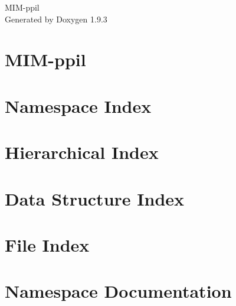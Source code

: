 \documentclass[twoside]{book}
\newcommand{\+}{\discretionary{\mbox{\scriptsize$\hookleftarrow$}}{}{}}
\newcommand{\clearemptydoublepage}{%
    \newpage{\pagestyle{empty}\cleardoublepage}%
  }
\begin{document}
  \raggedbottom
    \hypersetup{pageanchor=false,
                bookmarksnumbered=true,
                pdfencoding=unicode
               }
  \begin{titlepage}
  \vspace*{7cm}
  \begin{center}%
  {\Large MIM-\/ppil}\\
  \vspace*{1cm}
  {\large Generated by Doxygen 1.9.3}\\
  \end{center}
  \end{titlepage}
  \clearemptydoublepage
  \tableofcontents
  \clearemptydoublepage
  \hypersetup{pageanchor=true}
\chapter{MIM-\/ppil}
\label{md__r_e_a_d_m_e}

\chapter{Namespace Index}

\chapter{Hierarchical Index}

\chapter{Data Structure Index}

\chapter{File Index}

\chapter{Namespace Documentation}







\end{document}
